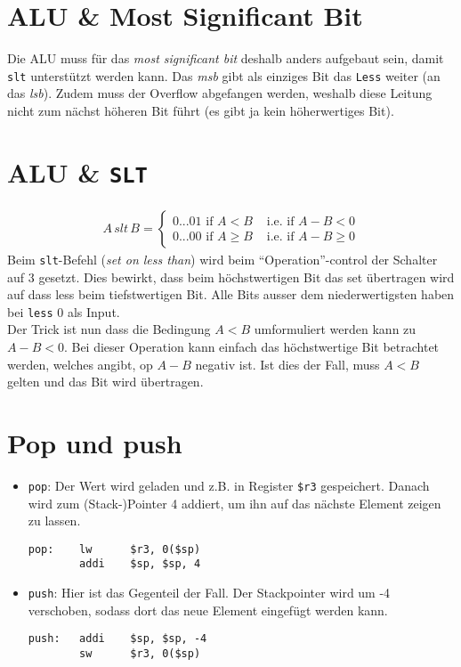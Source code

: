 \documentclass[a4paper,10pt,headlines=3.2]{scrartcl}
\begin{document}
\section{ALU \& Most Significant Bit}
Die ALU muss für das \textit{most significant bit} deshalb anders aufgebaut sein, damit \texttt{slt} unterstützt werden kann. Das \textit{msb} gibt als einziges Bit das \texttt{Less} weiter (an das \textit{lsb}). Zudem muss der Overflow abgefangen werden, weshalb diese Leitung nicht zum nächst höheren Bit führt (es gibt ja kein höherwertiges Bit).
\newpage

\section{ALU \& \texttt{SLT}}
\begin{align}
A\,slt\,B = \left \{ \begin{matrix} 0...01\text{ if } A < B & \text{ i.e. if } A-B < 0 \\ 0...00\text{ if } A \geq B & \text{ i.e. if } A-B \geq 0 \end{matrix} \right.
\end{align}
Beim \texttt{slt}-Befehl (\textit{set on less than}) wird beim ``Operation''-control der Schalter auf 3 gesetzt. Dies bewirkt, dass beim höchstwertigen Bit das set übertragen wird auf dass less beim tiefstwertigen Bit. Alle Bits ausser dem niederwertigsten haben bei \texttt{less} 0 als Input. \\
Der Trick ist nun dass die Bedingung $A < B$ umformuliert werden kann zu $A-B < 0$. Bei dieser Operation kann einfach das höchstwertige Bit betrachtet werden, welches angibt, op $A-B$ negativ ist. Ist dies der Fall, muss $A < B$ gelten und das Bit wird übertragen.

\section{Pop und push}
\begin{itemize}
\item \texttt{pop}: Der Wert wird geladen und z.B. in Register \texttt{\$r3} gespeichert. Danach wird zum (Stack-)Pointer 4 addiert, um ihn auf das nächste Element zeigen zu lassen.
\begin{verbatim}
pop:    lw      $r3, 0($sp)
        addi    $sp, $sp, 4
\end{verbatim}
\item \texttt{push}: Hier ist das Gegenteil der Fall. Der Stackpointer wird um -4 verschoben, sodass dort das neue Element eingefügt werden kann.
\begin{verbatim}
push:   addi    $sp, $sp, -4
        sw      $r3, 0($sp)
\end{verbatim}
\end{itemize}
\end{document}
